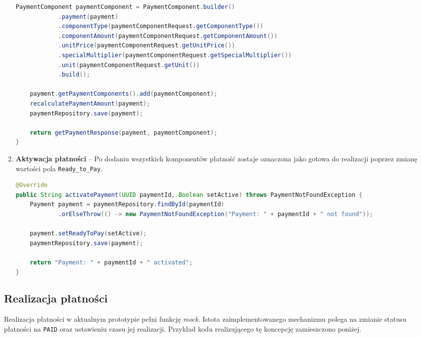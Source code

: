 \begin{enumerate}
\begin{lstlisting}[language=Java, style=JavaStyle, caption=Fragment metody \texttt{addPaymentComponent}]
    PaymentComponent paymentComponent = PaymentComponent.builder()
            .payment(payment)
            .componentType(paymentComponentRequest.getComponentType())
            .componentAmount(paymentComponentRequest.getComponentAmount())
            .unitPrice(paymentComponentRequest.getUnitPrice())
            .specialMultiplier(paymentComponentRequest.getSpecialMultiplier())
            .unit(paymentComponentRequest.getUnit())
            .build();

    payment.getPaymentComponents().add(paymentComponent);
    recalculatePaymentAmount(payment);
    paymentRepository.save(payment);

    return getPaymentResponse(payment, paymentComponent);
}
\end{lstlisting}

   \item \textbf{Aktywacja płatności} -- Po dodaniu wszystkich komponentów płatność zostaje oznaczona jako gotowa do realizacji poprzez zmianę wartości pola \texttt{Ready\_to\_Pay}.
    
\begin{lstlisting}[language=Java, style=JavaStyle, caption=Fragment metody \texttt{activatePayment}]
@Override
public String activatePayment(UUID paymentId, Boolean setActive) throws PaymentNotFoundException {
    Payment payment = paymentRepository.findById(paymentId)
            .orElseThrow(() -> new PaymentNotFoundException("Payment: " + paymentId + " not found"));

    payment.setReadyToPay(setActive);
    paymentRepository.save(payment);

    return "Payment: " + paymentId + " activated";
}
\end{lstlisting}
\end{enumerate}

\subsection{Realizacja płatności}
Realizacja płatności w aktualnym prototypie pełni funkcję \emph{mock}. Istota zaimplementowanego mechanizmu polega na zmianie statusu płatności na \texttt{PAID} oraz ustawieniu czasu jej realizacji. Przykład kodu realizującego tę koncepcję zamieszczono poniżej.

